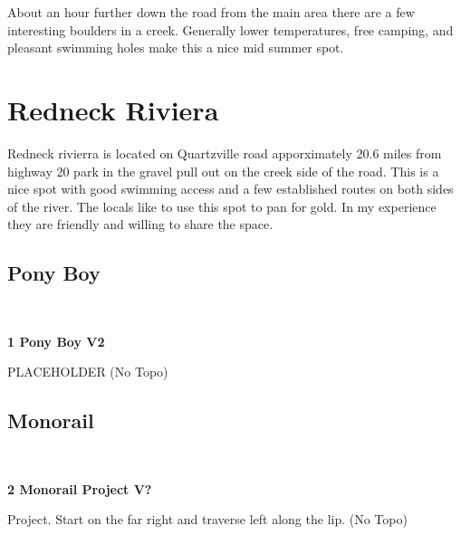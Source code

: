 \begin{multicols*}{2}
\begin{minipage}{\columnwidth}
About an hour further down the road from the main area there are a few interesting boulders in a creek. Generally lower temperatures, free camping, and pleasant swimming holes make this a nice mid summer spot.
\end{minipage}

		\section{Redneck Riviera}\label{sa:Redneck Riviera}
	\begin{minipage}{\columnwidth}
	Redneck rivierra is located on Quartzville road apporximately 20.6 miles from highway 20 park in the gravel pull out on the creek side of the road. This is a nice spot with good swimming access and a few established routes on both sides of the river. The locals like to use this spot to pan for gold. In my experience they are friendly and willing to share the space.
	\end{minipage}
			\subsection*{Pony Boy}\label{bf:Pony Boy}
			\begin{minipage}{\columnwidth}
			\
			\end{minipage}
			
					\label{rt:Pony Boy}\colorbox{green!20}{\textbf{1 Pony Boy V2  }}
					\begin{adjustwidth}{0.5cm}{}
					\begin{minipage}{\linewidth}					
					PLACEHOLDER
						\newline (No Topo) 
					\end{minipage}
					\end{adjustwidth}
			\subsection*{Monorail}\label{bf:Monorail}
			\begin{minipage}{\columnwidth}
			\
			\end{minipage}
			
					\label{rt:Monorail Project}\colorbox{black!20}{\textbf{2 Monorail Project V?  }}
					\begin{adjustwidth}{0.5cm}{}
					\begin{minipage}{\linewidth}					
					Project. Start on the far right and traverse left along the lip.
						\newline (No Topo) 
					\end{minipage}
					\end{adjustwidth}

\end{multicols*}
